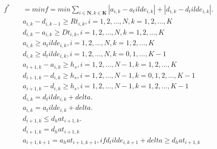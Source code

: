 \begin{align}
  f^{*}\quad & = min f = min \sum_{i \in \mathbf{N} , k \in \mathbf{K}} \left|a_{i , k} - a_tilde_{i , k}\right| + \left|d_{i , k} - d_tilde_{i , k}\right| . \tag{eq\_0001} \\
  & a_{i , k} - d_{i , k - 1} \geq \mathit{Rt}_{i , k} , i = 1 , 2 , \ldots , N , k = 1 , 2 , \ldots , K \tag{eq\_0003} \\
  & d_{i , k} - a_{i , k} \geq \mathit{Dt}_{i , k} , i = 1 , 2 , \ldots , N , k = 1 , 2 , \ldots , K \tag{eq\_0004} \\
  & a_{i , k} \geq a_tilde_{i , k} , i = 1 , 2 , \ldots , N , k = 1 , 2 , \ldots , K \tag{eq\_0005} \\
  & d_{i , k} \geq d_tilde_{i , k} , i = 1 , 2 , \ldots , N , k = 0 , 1 , \ldots , K - 1 \tag{eq\_0006} \\
  & a_{i + 1 , k} - a_{i , k} \geq h_{s} , i = 1 , 2 , \ldots , N - 1 , k = 1 , 2 , \ldots , K \tag{eq\_0007} \\
  & d_{i + 1 , k} - d_{i , k} \geq h_{s} , i = 1 , 2 , \ldots , N - 1 , k = 0 , 1 , 2 , \ldots , K - 1 \tag{eq\_0008} \\
  & a_{i + 1 , k} - d_{i , k} \geq h_{s} , i = 1 , 2 , \ldots , N - 1 , k = 1 , 2 , \ldots , K - 1 \tag{eq\_0009} \\
  & d_{i , k} = d_tilde_{i , k} + \mathit{delta} . \tag{eq\_0010} \\
  & a_{i , k} = a_tilde_{i , k} + \mathit{delta} . \tag{eq\_0011} \\
  & d_{i + 1 , k} \leq d_hat_{i + 1 , k} . \tag{eq\_0012} \\
  & d_{i+1,k} = d_hat_{i+1,k} \tag{eq\_0013\_a} \\
  & a_{i+1,k+1} = a_hat_{i+1,k+1} , if d_tilde_{i,k+1} + \mathit{delta} \geq d_hat_{i+1,k} \tag{eq\_0013\_b} \\

\end{align}
